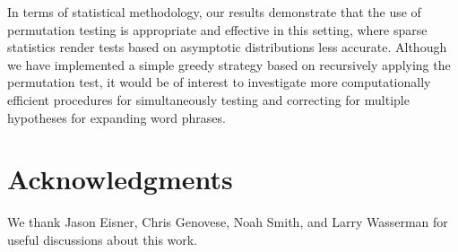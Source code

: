 \documentclass[11pt]{article}
\begin{document}
In terms of statistical methodology, our results demonstrate that the
use of permutation testing is appropriate and effective in this
setting, where sparse statistics render tests based on asymptotic
distributions less accurate.  Although we have implemented a simple
greedy strategy based on recursively applying the permutation test, it
would be of interest to investigate more computationally efficient
procedures for simultaneously testing and correcting for multiple
hypotheses for expanding word phrases.

\section*{Acknowledgments}

We thank Jason Eisner, Chris Genovese, Noah Smith, and Larry Wasserman
for useful discussions about this work.



\end{document}
